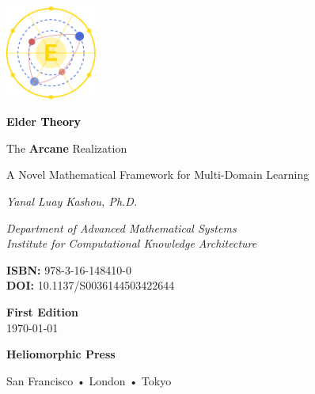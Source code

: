 \documentclass[11pt,twoside]{book}
\begin{document}
\frontmatter

\begin{titlepage}
    \centering
    \vspace*{0.5cm}
    \includegraphics[width=3cm]{figures/elder_symbol.pdf}
    \vspace{0.5cm}
    
    {\Huge\bfseries \textcolor{DarkSkyBlue}{Elder }\textrm{\textcolor{black}{Theory}}\par}
    \vspace{0.8cm}
    {\Large The \textcolor{DarkSkyBlue}{\textbf{Arcane}} Realization\par}
    \vspace{0.3cm}
    {\large A Novel Mathematical Framework for Multi-Domain Learning\par}
    
    \vspace{3cm}
    {\Large\itshape Yanal Luay Kashou, Ph.D.\par}
    \vspace{0.5cm}
    {\itshape Department of Advanced Mathematical Systems\\ Institute for Computational Knowledge Architecture\par}
    
    \vfill
    
    \begin{minipage}{0.4\textwidth}
        \begin{flushleft}
            \textbf{ISBN:} 978-3-16-148410-0 \\
            \textbf{DOI:} 10.1137/S0036144503422644
        \end{flushleft}
    \end{minipage}%
    \begin{minipage}{0.4\textwidth}
        \begin{flushright}
            \textbf{First Edition} \\
            \today
        \end{flushright}
    \end{minipage}
    
    \vspace{1cm}
    {\large \textbf{Heliomorphic Press}\par}
    {\small San Francisco • London • Tokyo\par}
\end{titlepage}
\end{document}
